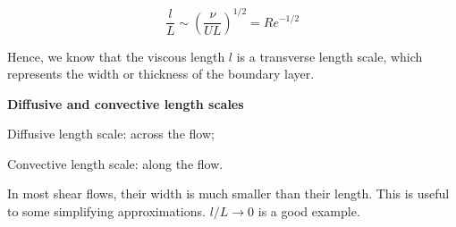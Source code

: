 \documentclass{article}
\begin{document}
\begin{equation*}
    \frac{l}{L}\sim\left(\frac{\nu}{UL}\right)^{1/2}=Re^{-1/2}
\end{equation*}

Hence, we know that the viscous length $l$ is a transverse length scale, which represents the width or thickness of the boundary layer.

\textbf{Diffusive and convective length scales}

Diffusive length scale: across the flow;

Convective length scale: along the flow.

In most shear flows, their width is much smaller than their length. This is useful to some simplifying approximations. $l/L\rightarrow 0$ is a good example.


\ifx\allfiles\undefined         %
\end{document}
